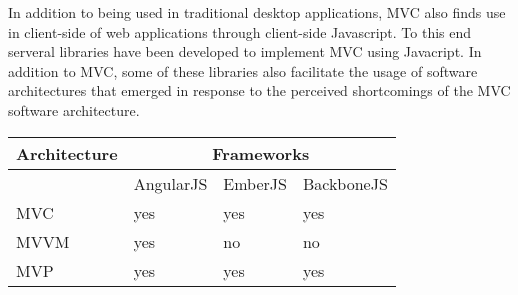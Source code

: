 In addition to being used in traditional desktop applications, MVC also finds use in client-side of web applications through client-side Javascript. To this end serveral libraries have been developed to implement MVC using Javacript. In addition to MVC, some of these libraries also facilitate the usage of software architectures that emerged in response to the perceived shortcomings of the MVC software architecture.

\begin{table}[h]
\begin{tabular}{|l|l|l|l|}
\hline
\multicolumn{1}{|c|}{Architecture} & \multicolumn{3}{c|}{Frameworks}                                                                 \\ \hline
                                   & \multicolumn{1}{c|}{AngularJS} & \multicolumn{1}{c|}{EmberJS} & \multicolumn{1}{c|}{BackboneJS} \\ \hline
MVC                                & yes                            & yes                          & yes                             \\ \hline
MVVM                               & yes                            & no                           & no                              \\ \hline
MVP                                & yes                            & yes                          & yes                             \\ \hline
\end{tabular}
\end{table}






